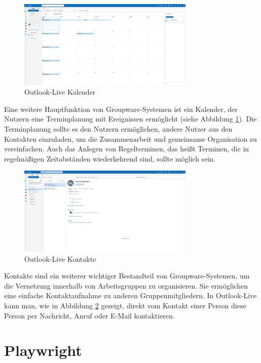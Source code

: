 \begin{figure}[H]
    \centering
    \includegraphics[width=0.75\textwidth]{images/OutlookLive_Calender1.png}
    \caption{Outlook-Live Kalender}
    \label{fig:outlook-live-calender}
\end{figure}

Eine weitere Hauptfunktion von Groupware-Systemen ist ein Kalender, der Nutzern eine Terminplanung mit Ereignissen ermöglicht (siehe Abbildung \ref{fig:outlook-live-calender}).
Die Terminplanung sollte es den Nutzern ermöglichen, andere Nutzer aus den Kontakten einzuladen, um die Zusammenarbeit und gemeinsame Organisation zu vereinfachen.
Auch das Anlegen von Regelterminen, das heißt Terminen, die in regelmäßigen Zeitabständen wiederkehrend sind, sollte möglich sein.

\begin{figure}[H]
    \centering
    \includegraphics[width=0.75\textwidth]{images/OutlookLive_Contacts.png}
    \caption{Outlook-Live Kontakte}
    \label{fig:outlook-live-contacts}
\end{figure}

Kontakte sind ein weiterer wichtiger Bestandteil von Groupware-Systemen, um die Vernetzung innerhalb von Arbeitsgruppen zu organisieren.
Sie ermöglichen eine einfache Kontaktaufnahme zu anderen Gruppenmitgliedern.
In Outlook-Live kann man, wie in Abbildung \ref{fig:outlook-live-contacts} gezeigt, direkt vom Kontakt einer Person diese Person per Nachricht, Anruf oder E-Mail kontaktieren.


\section{Playwright}

